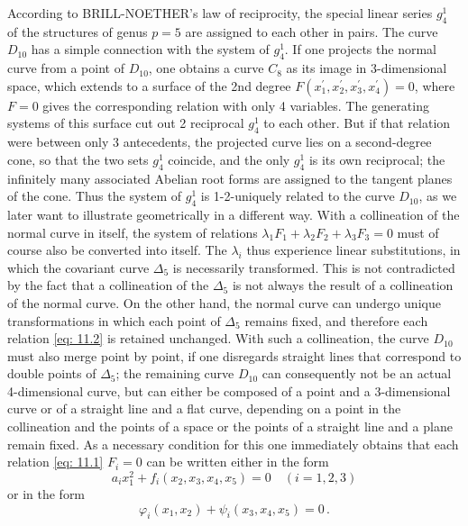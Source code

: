 \documentclass[leqno]{article}
\begin{document}
According to BRILL-NOETHER's law of reciprocity, the special linear series $g_4^1$ of the structures of genus $p=5$ are assigned to each other in pairs. The curve $D_{10}$ has a simple connection with the system of $g_4^1$. If one projects the normal curve from a point of $D_{10}$, one obtains a curve $C_8$ as its image in 3-dimensional space, which extends to a surface of the 2nd degree $F(x_1^\prime, x_2^ \prime, x_3^\prime, x_4^\prime)=0$, where $F=0$ gives the corresponding relation with only 4 variables. The generating systems of this surface cut out 2 reciprocal $g_4^1$ to each other. But if that relation were between only 3 antecedents, the projected curve lies on a second-degree cone, so that the two sets $g_4^1$ coincide, and the only $g_4^1$ is its own reciprocal; the infinitely many associated Abelian root forms are assigned to the tangent planes of the cone. Thus the system of $g_4^1$ is 1-2-uniquely related to the curve $D_{10}$, as we later want to illustrate geometrically in a different way. With a collineation of the normal curve in itself, the system of relations $\lambda_1 F_1 + \lambda_2 F_2 + \lambda_3 F_3=0$ must of course also be converted into itself. The $\lambda_i$ thus experience linear substitutions, in which the covariant curve $\Delta_5$ is necessarily transformed. This is not contradicted by the fact that a collineation of the $\Delta_5$ is not always the result of a collineation of the normal curve. On the other hand, the normal curve can undergo unique transformations in which each point of $\Delta_5$ remains fixed, and therefore each relation \eqref{eq: 11.2} is retained unchanged. With such a collineation, the curve $D_{10}$ must also merge point by point, if one disregards straight lines that correspond to double points of $\Delta_5$; the remaining curve $D_{10}$ can consequently not be an actual 4-dimensional curve, but can either be composed of a point and a 3-dimensional curve or of a straight line and a flat curve, depending on a point in the collineation and the points of a space or the points of a straight line and a plane remain fixed. As a necessary condition for this one immediately obtains that each relation \eqref{eq: 11.1} $F_i=0$ can be written either in the form 
\begin{equation}\label{eq: 11.a}
a_i x_1^2 + f_i(x_2, x_3, x_4, x_5) = 0 \quad (i=1,2,3) \tag{a}
\end{equation} 
or in the form 
\begin{equation}\label{eq: 11.b}
\varphi_i(x_1, x_2) + \psi_i(x_3, x_4, x_5) = 0 \, . \tag{b}
\end{equation} 
\end{document}
